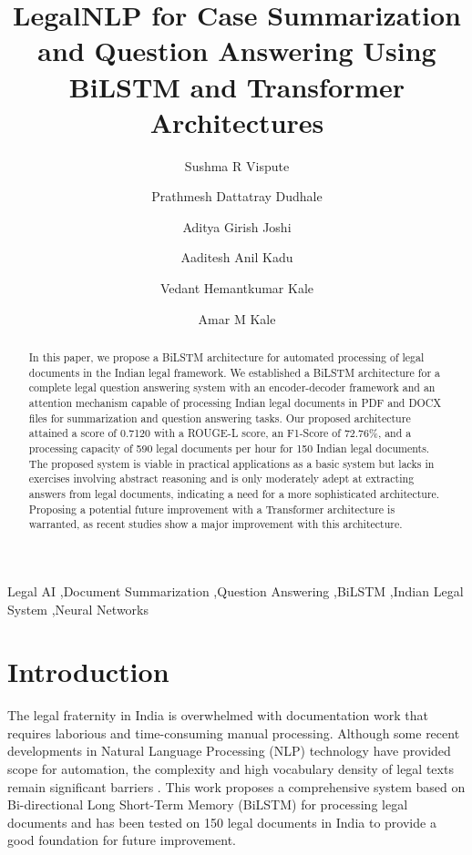 \documentclass[preprint,12pt]{elsarticle}
\begin{document}
\begin{frontmatter}

\title{LegalNLP for Case Summarization and Question Answering Using BiLSTM and Transformer Architectures}

\author[inst1]{Sushma R Vispute}
\author[inst1]{Prathmesh Dattatray Dudhale}
\author[inst1]{Aditya Girish Joshi}
\author[inst1]{Aaditesh Anil Kadu}
\author[inst1]{Vedant Hemantkumar Kale}
\author[inst1]{Amar M Kale}


\begin{abstract}
In this paper, we propose a BiLSTM architecture for automated processing of legal documents in the Indian legal framework. We established a BiLSTM architecture for a complete legal question answering system with an encoder-decoder framework and an attention mechanism capable of processing Indian legal documents in PDF and DOCX files for summarization and question answering tasks. Our proposed architecture attained a score of 0.7120 with a ROUGE-L score, an F1-Score of 72.76\%, and a processing capacity of 590 legal documents per hour for 150 Indian legal documents. The proposed system is viable in practical applications as a basic system but lacks in exercises involving abstract reasoning and is only moderately adept at extracting answers from legal documents, indicating a need for a more sophisticated architecture. Proposing a potential future improvement with a Transformer architecture is warranted, as recent studies show a major improvement with this architecture.
\end{abstract}

\begin{keyword}
Legal AI \sep Document Summarization \sep Question Answering \sep BiLSTM \sep Indian Legal System \sep Neural Networks
\end{keyword}

\end{frontmatter}

\section{Introduction}

The legal fraternity in India is overwhelmed with documentation work that requires laborious and time-consuming manual processing. Although some recent developments in Natural Language Processing (NLP) technology have provided scope for automation, the complexity and high vocabulary density of legal texts remain significant barriers \cite{akter2025legal}. This work proposes a comprehensive system based on Bi-directional Long Short-Term Memory (BiLSTM) for processing legal documents and has been tested on 150 legal documents in India to provide a good foundation for future improvement.
\end{document}
